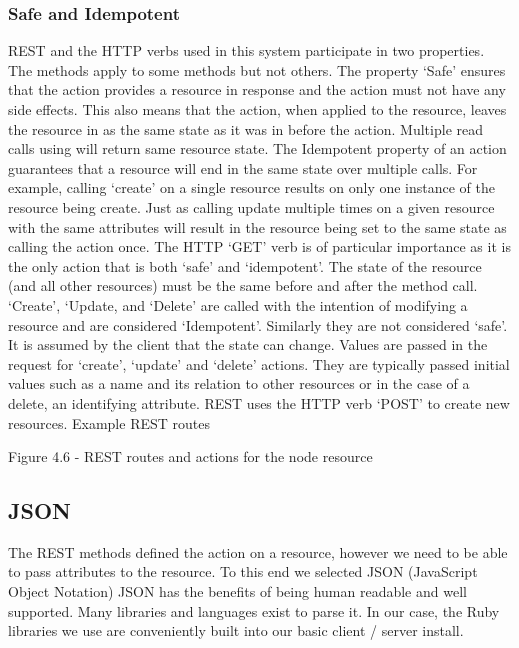 \subsubsection{Safe and Idempotent}
      REST and the HTTP verbs used in this system participate in two properties. The methods apply to some methods but not others.  The property ‘Safe’ ensures that the action provides a resource in response and the action must not have any side effects. This also means that the action, when applied to the resource, leaves the resource in as the same state as it was in before the action.  Multiple read calls using will return same resource state.  
      The Idempotent property of an action guarantees that a resource will end in the same state over multiple calls. For example, calling ‘create’ on a single resource results on only one instance of the resource being create.  Just as calling update multiple times on a given resource with the same attributes will result in the resource being set to the same state as calling the action once.  The HTTP ‘GET’ verb is of particular importance as it is the only action that is both ‘safe’ and ‘idempotent’.  
      The state of the resource (and all other resources) must be the same before and after the method call.  ‘Create’, ‘Update, and ‘Delete’ are called with the intention of modifying a resource and are considered ‘Idempotent’.  Similarly they are not considered ‘safe’.  It is assumed by the client that the state can change.  
       Values are passed in the request for ‘create’, ‘update’ and ‘delete’ actions.  They are typically passed initial values such as a name and its relation to other resources or in the case of a delete, an identifying attribute.  REST uses the HTTP verb ‘POST’ to create new resources.  
       Example REST routes
        
        Figure 4.6 - REST routes and actions for the node resource
\subsection{JSON}
        The REST methods defined the action on a resource, however we need to be able to pass attributes to the resource. To this end we selected JSON (JavaScript Object Notation)\cite{Bray:1aMFfDtC} JSON has the benefits of being human readable and well supported. Many libraries and languages exist to parse it. In our case, the Ruby libraries we use are conveniently built into our basic client / server install.  





